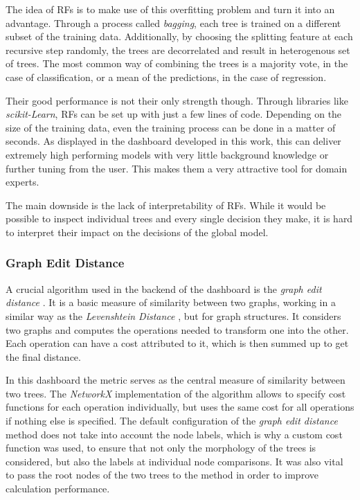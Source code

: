 \documentclass[a4paper, 12pt]{article}
\begin{document}
The idea of RFs is to make use of this overfitting problem and turn it into an advantage.
Through a process called \textit{bagging}, each tree is trained on a different subset of the
training data. Additionally, by choosing the splitting feature at each recursive step
randomly, the trees are decorrelated and result in heterogenous set of trees. The most
common way of combining the trees is a majority vote, in the case of classification, or a
mean of the predictions, in the case of regression. \par

Their good performance is not their only strength though. Through libraries like
\textit{scikit-Learn}, RFs can be set up with just a few lines of code. Depending on the size
of the training data, even the training process can be done in a matter of seconds. As
displayed in the dashboard developed in this work, this can deliver extremely high performing
models with very little background knowledge or further tuning from the user. This makes them
a very attractive tool for domain experts. \par

The main downside is the lack of interpretability of RFs. While it would be possible to inspect
individual trees and every single decision they make, it is hard to interpret their impact on
the decisions of the global model.

\subsubsection{Graph Edit Distance}
A crucial algorithm used in the backend of the dashboard is the \textit{graph edit distance}
\cite{sanfeliu1983distance}. It is a basic measure of similarity between two graphs, working in
a similar way as the \textit{Levenshtein Distance} \cite{levenshtein1966binary}, but for graph
structures. It considers two graphs and computes the operations needed to transform one into the
other. Each operation can have a cost attributed to it, which is then summed up to get the final
distance. \par

In this dashboard the metric serves as the central measure of similarity between two trees. The
\textit{NetworkX} implementation of the algorithm allows to specify cost functions for each
operation individually, but uses the same cost for all operations if nothing else is specified.
The default configuration of the \textit{graph edit distance} method does not take into account
the node labels, which is why a custom cost function was used, to ensure that not only the
morphology of the trees is considered, but also the labels at individual node comparisons.
It was also vital to pass the root nodes of the two trees to the method in order to improve
calculation performance. \par
\end{document}
